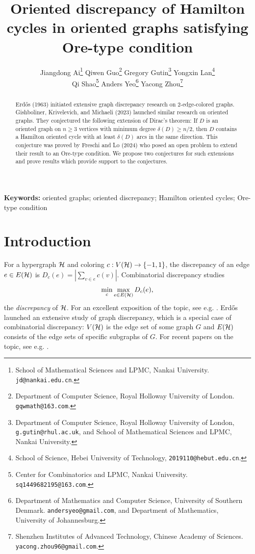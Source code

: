 \documentclass[11pt]{article}
\title{Oriented discrepancy of Hamilton cycles in oriented graphs satisfying Ore-type condition}
\author{Jiangdong Ai\thanks{School of Mathematical Sciences and LPMC, Nankai University. {\tt jd@nankai.edu.cn}.}
\hspace{2mm}
Qiwen Guo\thanks{Department of Computer Science, Royal Holloway University of London. {\tt gqwmath@163.com}.}
\hspace{2mm}
Gregory Gutin\thanks{Department of Computer Science, Royal Holloway University of London, {\tt g.gutin@rhul.ac.uk}, and School of Mathematical Sciences and LPMC, Nankai University.}
\hspace{2mm} Yongxin Lan\thanks{School of Science, Hebei University of Technology, {\tt  2019110@hebut.edu.cn}.}
\\ Qi Shao\thanks{Center for Combinatorics and LPMC, Nankai University. {\tt sq1449682195@163.com}.}
\hspace{2mm} Anders Yeo\thanks{Department of Mathematics and Computer Science, University of Southern Denmark. {\tt andersyeo@gmail.com}, and Department of Mathematics, University of Johannesburg.}
\hspace{2mm} Yacong Zhou\thanks{Shenzhen Institutes of Advanced Technology, Chinese Academy of Sciences. {\tt yacong.zhou96@gmail.com}.}}
\newtheorem{theorem}{Theorem}[section]
\newcommand{\2}{\vspace{0.2cm}}
\begin{document}
\maketitle

\begin{abstract}
Erd{\H o}s (1963) initiated extensive graph discrepancy research on 2-edge-colored graphs. Gishboliner, Krivelevich, and Michaeli (2023) launched similar research on oriented graphs. They conjectured the following extension of Dirac's theorem: If $D$ is an oriented graph on $n \ge 3$ vertices with minimum degree $\delta (D) \ge n/ 2$, then $D$ contains a Hamilton oriented cycle with at least $\delta(D)$ arcs in the same direction. This conjecture was proved by Freschi and Lo (2024) who posed an open problem to extend their result to an Ore-type condition. We propose two conjectures for such extensions and prove results which provide support to the conjectures.
\end{abstract}

\noindent\textbf{Keywords:} oriented graphs; oriented discrepancy; Hamilton oriented cycles; Ore-type condition
\section{Introduction}

For a hypergraph $\cal H$ and coloring $c: V({\cal H}) \rightarrow \{-1,1\}$, the discrepancy of an edge $e\in E({\cal H})$ is
$D_c(e)=|\sum_{v\in e} c(v)|.$ Combinatorial discrepancy studies $$\min_c \max_{e\in E({\cal H})}D_c(e),$$ the {\em discrepancy} of $\cal H$. For an excellent exposition of the topic, see e.g. \cite{M99}. Erd{\H o}s \cite{E63} launched an extensive study of graph discrepancy, which is a special case of combinatorial discrepancy: $V({\cal H})$ is the edge set of some graph $G$ and $E({\cal H})$ consists of the edge sets of specific subgraphs of $G.$ For recent papers on the topic, see e.g. \cite{BCJP,BCPT,FHLT,GKM22a,GKM22b}. %


\end{document}
